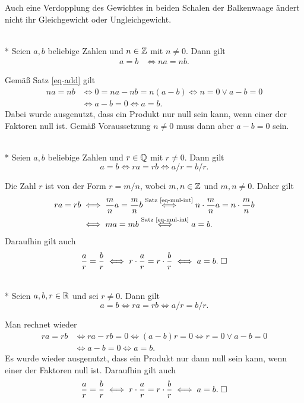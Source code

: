 \noindent
Auch eine Verdopplung des Gewichtes in beiden Schalen der Balkenwaage
ändert nicht ihr Gleichgewicht oder Ungleichgewicht.

\begin{Satz}[Äquivalenzumformungen]\label{eq-mul-int}\mbox{}\\*
Seien $a,b$ beliebige Zahlen und $n\in\mathbb Z$ mit $n\ne 0$. Dann gilt
\begin{align*}
a=b&\iff na=nb.
\end{align*}
\end{Satz}
 Gemäß Satz \ref{eq-add} gilt
\begin{align*}
na = nb &\iff 0 = na-nb = n(a-b)\iff n=0\lor a-b=0\\
&\iff a-b=0\iff a=b.
\end{align*}
Dabei wurde ausgenutzt, dass ein Produkt nur null sein kann,
wenn einer der Faktoren null ist. Gemäß Voraussetzung $n\ne 0$ muss
dann aber $a-b=0$ sein.\;\qedsymbol

\begin{Satz}[Äquivalenzumformungen]\mbox{}\\*
Seien $a,b$ beliebige Zahlen und $r\in\mathbb Q$ mit $r\ne 0$. Dann gilt
\[a=b\iff ra=rb\iff a/r=b/r.\]
\end{Satz}
Die Zahl $r$ ist von der Form $r=m/n$, wobei $m,n\in\mathbb Z$ und $m,n\ne 0$.
Daher gilt
\begin{align*}
ra=rb&\iff \frac{m}{n}a=\frac{m}{n}b
\stackrel{\text{Satz \ref{eq-mul-int}}}\iff n\cdot\frac{m}{n}a=n\cdot\frac{m}{n}b\\
&\iff ma=mb\stackrel{\text{Satz \ref{eq-mul-int}}}\iff a=b.
\end{align*}
Daraufhin gilt auch
\[\frac{a}{r}=\frac{b}{r}\iff r\cdot\frac{a}{r}=r\cdot\frac{b}{r}
\iff a=b.\;\Box\]

\begin{Satz}[Äquivalenzumformungen]\mbox{}\\*
Seien $a,b,r\in\mathbb R$ und sei $r\ne 0$. Dann gilt
\[a=b\iff ra=rb\iff a/r=b/r.\]
\end{Satz}
 Man rechnet wieder
\begin{align*}
ra = rb&\iff ra-rb=0\iff (a-b)r=0\iff r=0\lor a-b=0\\
&\iff a-b=0\iff a=b.
\end{align*}
Es wurde wieder ausgenutzt, dass ein Produkt nur dann null sein
kann, wenn einer der Faktoren null ist. Daraufhin gilt auch
\[\frac{a}{r}=\frac{b}{r}\iff r\cdot\frac{a}{r}=r\cdot\frac{b}{r}
\iff a=b.\;\Box\]


